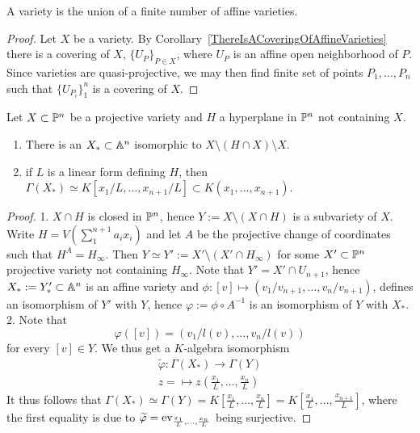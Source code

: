     \begin{proposition}
        A variety is the union of a finite number of affine varieties. 
    \end{proposition}
    \begin{proof}
        Let $X$ be a variety. By Corollary~\ref{ThereIsACoveringOfAffineVarieties} there is a covering of $X$, $\{U_P\}_{P \in X}$, where $U_P$ is an affine open neighborhood of $P$. Since varieties are quasi-projective, we may then find finite set of points $P_1,\dots,P_n$ such that $\{U_{P_i}\}_1^n$ is a covering of $X$.
    \end{proof}
    \begin{lemma}
        Let $X\subset \mathbb{P}^n$ be a projective variety and $H$ a hyperplane in $\mathbb{P}^n$ not containing $X$.
        \begin{enumerate}
            \item There is an $X_\ast\subset \mathbb{A}^n$ isomorphic to $X\setminus (H\cap X)\setminus X$.
            \item if $L$ is a linear form defining $H$, then $\Gamma(X_\ast)\simeq K[x_1/L,\dots,x_{n+1}/L]\subset K(x_1,\dots,x_{n+1})$.
        \end{enumerate}
    \end{lemma}
    \begin{proof}
        1. $X\cap H$ is closed in $\mathbb{P}^n$, hence $Y:=X\setminus (X\cap H)$ is a subvariety of $X$. Write $H=V\left(\sum_1^{n+1} a_ix_i\right)$ and let $A$ be the projective change of coordinates such that $H^A=H_\infty$. Then $Y\simeq Y':= X'\setminus(X'\cap H_\infty)$ for some $X'\subset \mathbb{P}^n$ projective variety not containing $H_\infty$. Note that $Y' = X'\cap U_{n+1}$, hence $X_\ast:= Y'_\ast \subset \mathbb{A}^n$ is an affine variety and $\phi:[v]\mapsto (v_1/v_{n+1},\dots,v_n/v_{n+1})$, defines an isomorphism of $Y'$ with $Y$, hence $\varphi := \phi\circ A^{-1}$ is an isomorphism of $Y$ with $X_\ast$.\\
        2. Note that 
        $$\varphi([v]) = (v_1/l(v),\dots,v_n/l(v))$$
        for every $[v]\in Y$. We thus get a $K$-algebra isomorphism
        \begin{gather*}
            \widetilde{\varphi}: \Gamma(X_\ast) \rightarrow \Gamma(Y)\\
            z = \mapsto z\left(\frac{x_1}{L},\dots,\frac{x_n}{L}\right) 
        \end{gather*}
        It thus follows that $\Gamma(X_\ast)\simeq \Gamma(Y)=K\left[\frac{x_1}{L},\dots,\frac{x_n}{L}\right]= K\left[\frac{x_1}{L},\dots,\frac{x_{n+1}}{L}\right]$, where the first equality is due to $\widetilde{\varphi}=\mathrm{ev}_{\frac{x_1}{L},\dots,\frac{x_n}{L}}$ being surjective. 
    \end{proof}
